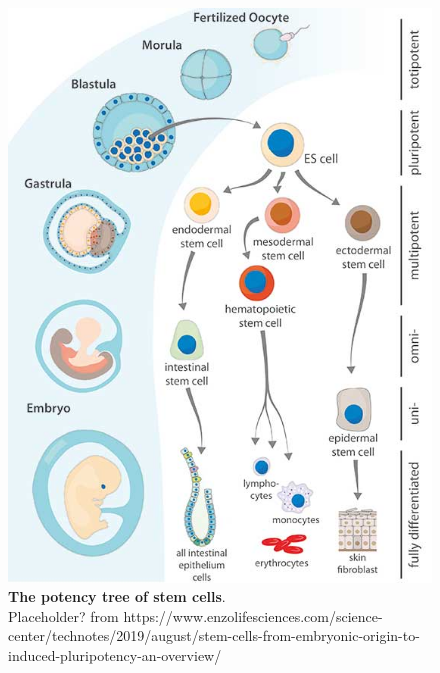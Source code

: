 \begin{figure}[htbp]
\centering
\includegraphics[width=13cm]{Chapter1/Fig/stem_cells.jpg}
\caption[\textbf{Stem Cells}]{\textbf{The potency tree of stem cells}.\\
Placeholder? from https://www.enzolifesciences.com/science-center/technotes/2019/august/stem-cells-from-embryonic-origin-to-induced-pluripotency-an-overview/}
\label{fig:stem_cells}
\end{figure}


